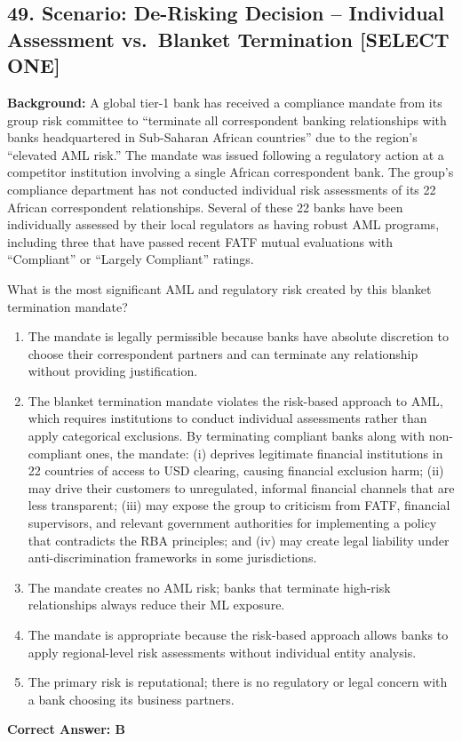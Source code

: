 \documentclass[11pt,a4paper]{article}
\begin{document}
	\subsection{49. Scenario: De-Risking Decision -- Individual Assessment vs.\ Blanket Termination \textnormal{[SELECT ONE]}}
	
	\textbf{Background:} A global tier-1 bank has received a compliance mandate from its group risk committee to ``terminate all correspondent banking relationships with banks headquartered in Sub-Saharan African countries'' due to the region's ``elevated AML risk.'' The mandate was issued following a regulatory action at a competitor institution involving a single African correspondent bank. The group's compliance department has not conducted individual risk assessments of its 22 African correspondent relationships. Several of these 22 banks have been individually assessed by their local regulators as having robust AML programs, including three that have passed recent FATF mutual evaluations with ``Compliant'' or ``Largely Compliant'' ratings.
	
	What is the most significant AML and regulatory risk created by this blanket termination mandate?
	
	\begin{enumerate}[label=\Alph*.]
		\item The mandate is legally permissible because banks have absolute discretion to choose their correspondent partners and can terminate any relationship without providing justification.
		\item The blanket termination mandate violates the risk-based approach to AML, which requires institutions to conduct individual assessments rather than apply categorical exclusions. By terminating compliant banks along with non-compliant ones, the mandate: (i) deprives legitimate financial institutions in 22 countries of access to USD clearing, causing financial exclusion harm; (ii) may drive their customers to unregulated, informal financial channels that are less transparent; (iii) may expose the group to criticism from FATF, financial supervisors, and relevant government authorities for implementing a policy that contradicts the RBA principles; and (iv) may create legal liability under anti-discrimination frameworks in some jurisdictions.
		\item The mandate creates no AML risk; banks that terminate high-risk relationships always reduce their ML exposure.
		\item The mandate is appropriate because the risk-based approach allows banks to apply regional-level risk assessments without individual entity analysis.
		\item The primary risk is reputational; there is no regulatory or legal concern with a bank choosing its business partners.
	\end{enumerate}
	\textbf{Correct Answer: B}
	
\end{document}
